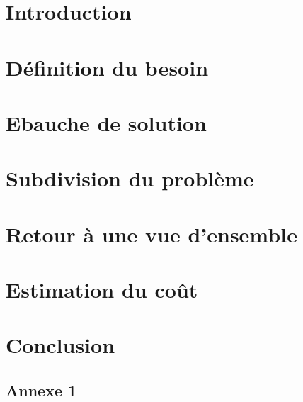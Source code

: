 \documentclass[11pt]{article}
\begin{document}


\newpage
\tableofcontents
\newpage
{}

\section{Introduction}

	

\newpage
\section{Définition du besoin}

	

\newpage
\section{Ebauche de solution}

	


\newpage
\section{Subdivision du problème}

	

\newpage
\section{Retour à une vue d'ensemble}

	

\newpage
\section{Estimation du coût}

	

\newpage
\section{Conclusion}
	
	

\setcounter{secnumdepth}{0}
\renewcommand{\thesubsection}{\Alph{subsection}}

\newpage
{}

	\subsection{Annexe 1}
\end{document}
